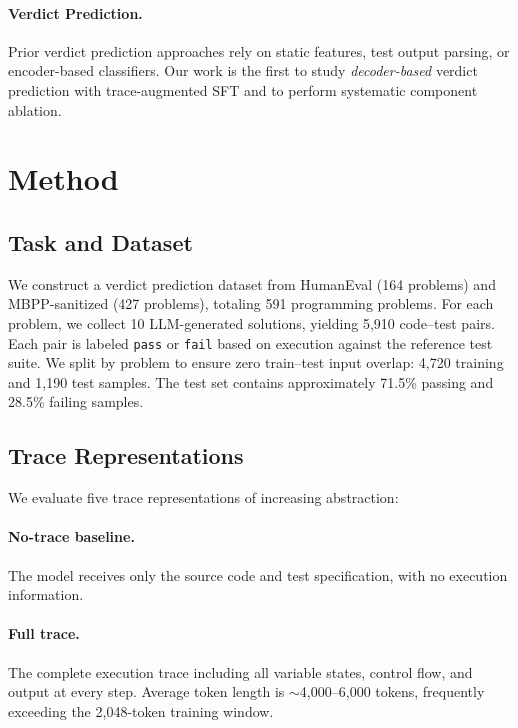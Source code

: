 \documentclass[11pt]{article}
\begin{document}
\paragraph{Verdict Prediction.}
Prior verdict prediction approaches rely on static features, test output parsing, or encoder-based classifiers.
Our work is the first to study \emph{decoder-based} verdict prediction with trace-augmented SFT and to perform systematic component ablation.

\section{Method}
\label{sec:method}

\subsection{Task and Dataset}
\label{sec:dataset}

We construct a verdict prediction dataset from HumanEval (164 problems) and MBPP-sanitized (427 problems), totaling 591 programming problems.
For each problem, we collect 10 LLM-generated solutions, yielding 5{,}910 code--test pairs.
Each pair is labeled \texttt{pass} or \texttt{fail} based on execution against the reference test suite.
We split by problem to ensure zero train--test input overlap: 4{,}720 training and 1{,}190 test samples.
The test set contains approximately 71.5\% passing and 28.5\% failing samples.

\subsection{Trace Representations}
\label{sec:traces}

We evaluate five trace representations of increasing abstraction:

\paragraph{No-trace baseline.}
The model receives only the source code and test specification, with no execution information.

\paragraph{Full trace.}
The complete execution trace including all variable states, control flow, and output at every step.
Average token length is ${\sim}$4{,}000--6{,}000 tokens, frequently exceeding the 2{,}048-token training window.
\end{document}
